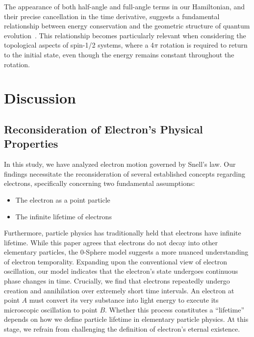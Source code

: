 \documentclass[%
 reprint,
 amsmath,amssymb,
 aps,
]{revtex4-1}
\numberwithin{equation}{section}%
\begin{document}
The appearance of both half-angle and full-angle terms in our Hamiltonian, and their precise cancellation in the time derivative, suggests a fundamental relationship between energy conservation and the geometric structure of quantum evolution~\cite{wilczek1984}. This relationship becomes particularly relevant when considering the topological aspects of spin-1/2 systems, where a 4$\pi$ rotation is required to return to the initial state, even though the energy remains constant throughout the rotation.


\section{\label{sec:Discussion}Discussion}

\subsection{\label{sec:Reconsideration of Electron's}Reconsideration of Electron's Physical Properties}

In this study, we have analyzed electron motion governed by Snell's law. Our findings necessitate the reconsideration of several established concepts regarding electrons, specifically concerning two fundamental assumptions:

\begin{itemize}
    \item The electron as a point particle
    \item The infinite lifetime of electrons
\end{itemize}

Furthermore, particle physics has traditionally held that electrons have infinite lifetime. While this paper agrees that electrons do not decay into other elementary particles, the 0-Sphere model suggests a more nuanced understanding of electron temporality. Expanding upon the conventional view of electron oscillation, our model indicates that the electron's state undergoes continuous phase changes in time. Crucially, we find that electrons repeatedly undergo creation and annihilation over extremely short time intervals. An electron at point $A$ must convert its very substance into light energy to execute its microscopic oscillation to point $B$. Whether this process constitutes a ``lifetime'' depends on how we define particle lifetime in elementary particle physics. At this stage, we refrain from challenging the definition of electron's eternal existence.
\end{document}
